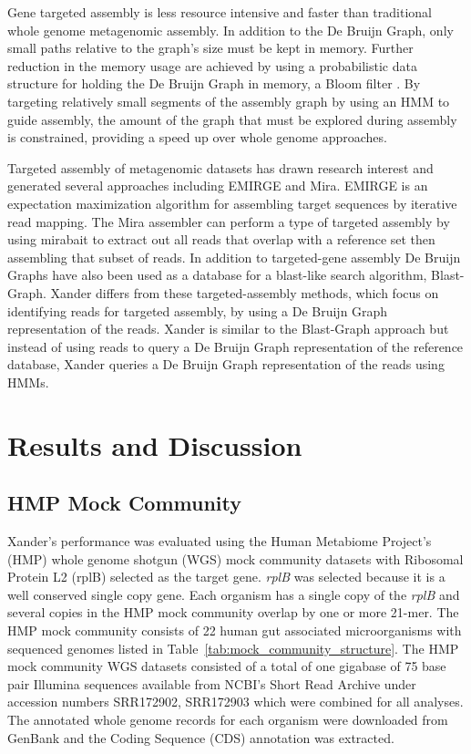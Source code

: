 \documentclass[10pt]{bmc_article}
\newenvironment{bmcformat}{\begin{raggedright}\baselineskip20pt\sloppy\setboolean{publ}{false}}{\end{raggedright}\baselineskip20pt\sloppy}
\begin{document}
\begin{bmcformat}
Gene targeted assembly is less resource intensive and faster than traditional whole genome metagenomic assembly.  In addition to the De Bruijn Graph, only small paths relative to the graph's size must be kept in memory.  Further reduction in the memory usage are achieved by using a probabilistic data structure for holding the De Bruijn Graph in memory, a Bloom filter \cite{bloom_space/time_1970,pell_scaling_2012}.  By targeting relatively small segments of the assembly graph by using an HMM to guide assembly, the amount of the graph that must be explored during assembly is constrained, providing a speed up over whole genome approaches.

Targeted assembly of metagenomic datasets has drawn research interest and generated several approaches including EMIRGE\cite{miller_emirge:_2011} and Mira\cite{chevreux_using_2004}. EMIRGE is an expectation maximization algorithm for assembling target sequences by iterative read mapping.  The Mira assembler can perform a type of targeted assembly by using mirabait to extract out all reads that overlap with a reference set then assembling that subset of reads.  In addition to targeted-gene assembly De Bruijn Graphs have also been used as a database for a blast-like search algorithm, Blast-Graph\cite{holley_blastgraph:_2012}.  Xander differs from these targeted-assembly methods, which focus on identifying reads for targeted assembly, by using a De Bruijn Graph representation of the reads.  Xander is similar to the Blast-Graph approach but instead of using reads to query a De Bruijn Graph representation of the reference database, Xander queries a De Bruijn Graph representation of the reads using HMMs.
\section*{Results and Discussion}
\subsection*{HMP Mock Community}
Xander's performance was evaluated using the Human Metabiome Project's (HMP) whole genome shotgun (WGS) mock community datasets with Ribosomal Protein L2 (rplB) selected as the target gene.  \emph{rplB} was selected because it is a well conserved single copy gene.  Each organism has a single copy of the \emph{rplB} and several copies in the HMP mock community overlap by one or more 21-mer. The HMP mock community consists of 22 human gut associated microorganisms with sequenced genomes listed in Table~\ref{tab:mock_community_structure}.  The HMP mock community WGS datasets consisted of a total of one gigabase of 75 base pair Illumina sequences available from NCBI's Short Read Archive under accession numbers SRR172902, SRR172903 which were combined for all analyses.  The annotated whole genome records for each organism were downloaded from GenBank and the Coding Sequence (CDS) annotation was extracted.


\end{bmcformat}
\end{document}

